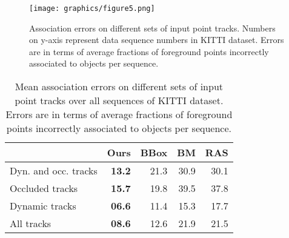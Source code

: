 \begin{figure*}[!!t]
\centering
\texttt{[image: graphics/figure5.png]}
  \vspace{-0.3cm}
  \caption{\small Association errors on different sets of input point tracks. Numbers on y-axis represent data sequence numbers in KITTI dataset. Errors are in terms of average fractions of foreground points incorrectly associated to objects per sequence.}
  \vspace{-0.3cm}
  \label{fig:assoc-occ-results}
\end{figure*}

\begin{table}
\begin{tabular}{lrrrr}
  \toprule
  & Ours & BBox & BM & RAS\\
  \midrule
  Dyn. and occ. tracks        & \textbf{13.2} & 21.3 & 30.9 & 30.1 \\
  Occluded tracks             & \textbf{15.7} & 19.8 & 39.5 & 37.8 \\
  Dynamic tracks              & \textbf{06.6} & 11.4 & 15.3 & 17.7 \\
  All tracks                  & \textbf{08.6} & 12.6 & 21.9 & 21.5 \\
  \bottomrule
\end{tabular}
\caption{\small Mean association errors on different sets of input point tracks over all sequences of KITTI dataset. Errors are in terms of average fractions of foreground points incorrectly associated to objects per sequence.}
\label{tab:meanAssoc}
\end{table}


